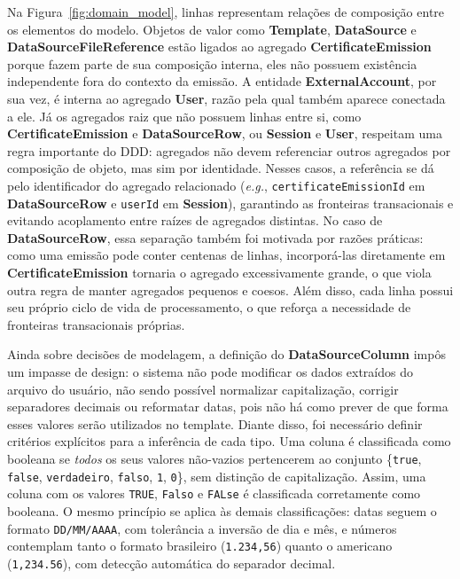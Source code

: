 \documentclass[article,a4paper,12pt,brazil,sumario=tradicional]{abntex2}
\begin{document}
Na Figura~\ref{fig:domain_model}, linhas representam relações de composição entre os elementos do modelo. Objetos de valor como \textbf{Template}, \textbf{DataSource} e \textbf{DataSourceFileReference} estão ligados ao agregado \textbf{CertificateEmission} porque fazem parte de sua composição interna, eles não possuem existência independente fora do contexto da emissão. A entidade \textbf{ExternalAccount}, por sua vez, é interna ao agregado \textbf{User}, razão pela qual também aparece conectada a ele. Já os agregados raiz que não possuem linhas entre si, como \textbf{CertificateEmission} e \textbf{DataSourceRow}, ou \textbf{Session} e \textbf{User}, respeitam uma regra importante do DDD: agregados não devem referenciar outros agregados por composição de objeto, mas sim por identidade. Nesses casos, a referência se dá pelo identificador do agregado relacionado (\textit{e.g.}, \texttt{certificateEmissionId} em \textbf{DataSourceRow} e \texttt{userId} em \textbf{Session}), garantindo as fronteiras transacionais e evitando acoplamento entre raízes de agregados distintas. No caso de \textbf{DataSourceRow}, essa separação também foi motivada por razões práticas: como uma emissão pode conter centenas de linhas, incorporá-las diretamente em \textbf{CertificateEmission} tornaria o agregado excessivamente grande, o que viola outra regra de manter agregados pequenos e coesos. Além disso, cada linha possui seu próprio ciclo de vida de processamento, o que reforça a necessidade de fronteiras transacionais próprias.

Ainda sobre decisões de modelagem, a definição do \textbf{DataSourceColumn} impôs um impasse de design: o sistema não pode modificar os dados extraídos do arquivo do usuário, não sendo possível normalizar capitalização, corrigir separadores decimais ou reformatar datas, pois não há como prever de que forma esses valores serão utilizados no template. Diante disso, foi necessário definir critérios explícitos para a inferência de cada tipo. Uma coluna é classificada como booleana se \emph{todos} os seus valores não-vazios pertencerem ao conjunto \{\texttt{true}, \texttt{false}, \texttt{verdadeiro}, \texttt{falso}, \texttt{1}, \texttt{0}\}, sem distinção de capitalização. Assim, uma coluna com os valores \texttt{TRUE}, \texttt{Falso} e \texttt{FALse} é classificada corretamente como booleana. O mesmo princípio se aplica às demais classificações: datas seguem o formato \texttt{DD/MM/AAAA}, com tolerância a inversão de dia e mês, e números contemplam tanto o formato brasileiro (\texttt{1.234,56}) quanto o americano (\texttt{1,234.56}), com detecção automática do separador decimal.
\end{document}

